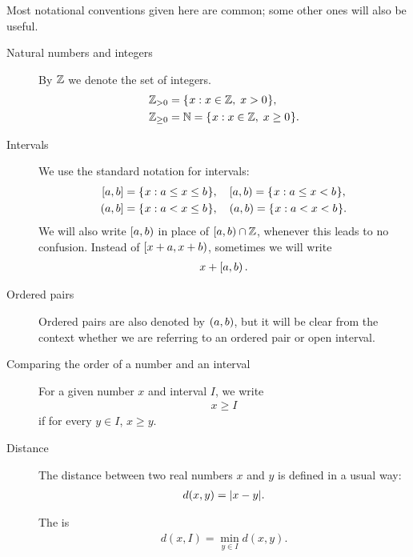 \documentclass[11pt]{memoir}
\theoremstyle{definition} %
\renewcommand{\le}{\leq}
\renewcommand{\ge}{\geq}
\begin{document}
Most notational conventions given here are common; some other ones will
also be useful.

\begin{description}

\item [Natural numbers and integers] 
By \( \mathbb{Z} \) we denote the set of integers.
\begin{align*}
   \bbZ_{>0}&=\setOf{x}{x\in \bbZ,\;  x>0}, \\
   \bbZ_{\ge 0}&=\bbN=\setOf{x}{x\in \bbZ,\;  x\ge 0}.
\end{align*}

\item [Intervals]
We use the standard notation for intervals:
\begin{align*}
   \clint{a}{b}&=\setOf{x}{a\le x \le b},\quad \lint{a}{b}=\setOf{x}{a\le x < b}, \\
   \rint{a}{b}&=\setOf{x}{a< x \le b}, \quad  \opint{a}{b}=\setOf{x}{a< x < b}.
\end{align*}
We will also write \( \left[a,b\right) \) in place of \( \left[a,b\right)\cap \mathbb{Z} \), 
whenever this leads to no confusion.
Instead of \( \left[x+a,x+b\right) \), sometimes we will write 
\begin{align*}x + \left[a,b\right).\end{align*}

\item [Ordered pairs]
Ordered pairs are also denoted by \( (a,b) \),
but it will be clear from the context whether we are
referring to an ordered pair or open interval.

\item [Comparing the order of a number and an interval]
For a given number \( x \) and interval \( I \), we
write
\begin{align*} x \ge I \end{align*}
if for every \( y\in I \),  \( x \ge y \).

\item [Distance]
The distance between two real numbers \( x \) and \( y \) is defined
in a usual way:
\begin{align*}
    d(x,y)= \lvert x-y \rvert.
\end{align*}

The   is
\begin{align*}
    d(x,I)= \min_{y\in I}d(x,y).
\end{align*}


\end{description}
\end{document}
